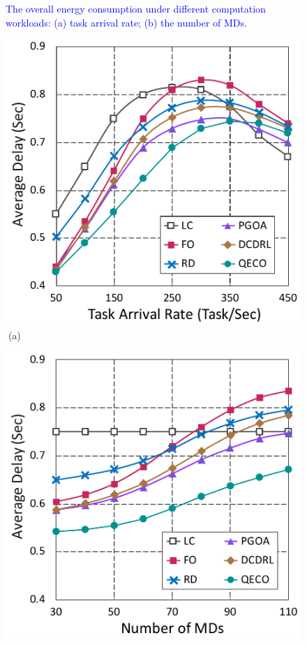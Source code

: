 \documentclass[12pt,draftclsnofoot,onecolumn]{IEEEtran}
\begin{document}
\begin{enumerate}
\begin{figure}[H]
	\caption{\textcolor{blue}{The overall energy consumption under different computation workloads: (a) task arrival rate; (b) the number of MDs.}}
	\label{chart2}
\end{figure}\vspace{-8mm}
\begin{figure}[H]\centering
	\captionsetup{name=Fig.}
	\begin{minipage}[b]{0.3\linewidth}
		\centering
		\includegraphics[width=\textwidth]{ delay_1} 		
		\textcolor{white}{i}\hspace{0.6cm}(a)
	\end{minipage}
	\hspace{-0.2cm}
	\begin{minipage}[b]{0.3\linewidth}
		\centering
		\includegraphics[width=\textwidth]{ delay_2}

\end{minipage}
\end{figure}
\end{enumerate}
\end{document}

